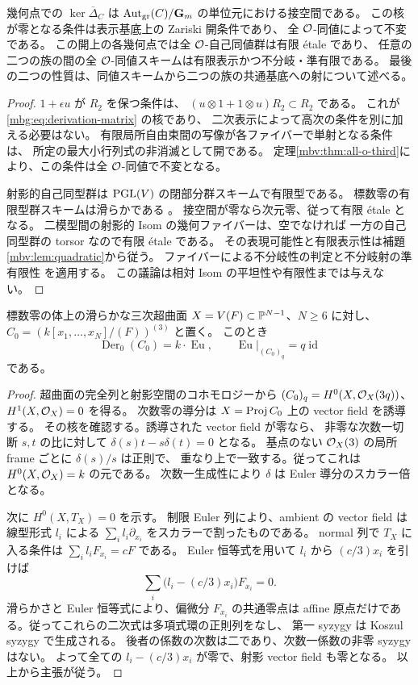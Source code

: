 \begin{lemma}[自己同値の接空間と開条件]
\label{mbg:lem:tangent-open}
幾何点での $\ker\overline\Delta_C$ は
$\operatorname{Aut}_{\mathrm{gr}}(C)/\mathbf G_m$ の単位元における接空間である。
この核が零となる条件は表示基底上の Zariski 開条件であり、
全 $\mathcal O$-同値によって不変である。
この開上の各幾何点では全 $\mathcal O$-自己同値群は有限 \'etale であり、
任意の二つの族の間の全 $\mathcal O$-同値スキームは有限表示かつ不分岐・準有限である。
最後の二つの性質は、同値スキームから二つの族の共通基底への射について述べる。
\end{lemma}
\begin{proof}
$1+\epsilon u$ が $R_2$ を保つ条件は、
$(u\otimes1+1\otimes u)R_2\subset R_2$ である。
これが \eqref{mbg:eq:derivation-matrix} の核であり、
二次表示によって高次の条件を別に加える必要はない。
有限局所自由束間の写像が各ファイバーで単射となる条件は、
所定の最大小行列式の非消滅として開である。
定理\ref{mbv:thm:all-o-third}により、この条件は全 $\mathcal O$-同値で不変となる。

射影的自己同型群は $\operatorname{PGL}(V)$ の閉部分群スキームで有限型である。
標数零の有限型群スキームは滑らかである
\cite[Tag~047N]{MBGStacks}。
接空間が零なら次元零、従って有限 \'etale となる。
二模型間の射影的 Isom の幾何ファイバーは、空でなければ
一方の自己同型群の torsor なので有限 \'etale である。
その表現可能性と有限表示性は補題\ref{mbv:lem:quadratic}から従う。
ファイバーによる不分岐性の判定と不分岐射の準有限性
\cite[Tag~02G3, Lemmas~29.36.10 and~29.36.12]{MBGStacks}を適用する。
この議論は相対 Isom の平坦性や有限性までは与えない。
\end{proof}

\begin{lemma}[滑らかな可換三次の切断環の導分]
\label{mbg:lem:commutative-tangent}
標数零の体上の滑らかな三次超曲面
$X=V(F)\subset\mathbb P^{N-1}$、$N\ge6$ に対し、
$C_0=(k[x_1,\ldots,x_N]/(F))^{(3)}$ と置く。
このとき
\[
 \operatorname{Der}_0(C_0)=k\cdot\operatorname{Eu},
 \qquad \operatorname{Eu}|_{(C_0)_q}=q\operatorname{id}
\]
である。
\end{lemma}
\begin{proof}
超曲面の完全列と射影空間のコホモロジーから
$(C_0)_q=H^0(X,\mathcal O_X(3q))$、$H^1(X,\mathcal O_X)=0$ を得る。
次数零の導分は $X=\operatorname{Proj} C_0$ 上の vector field を誘導する。
その核を確認する。誘導された vector field が零なら、
非零な次数一切断 $s,t$ の比に対して
$\delta(s)t-s\delta(t)=0$ となる。
基点のない $\mathcal O_X(3)$ の局所 frame ごとに $\delta(s)/s$ は正則で、
重なり上で一致する。従ってこれは $H^0(X,\mathcal O_X)=k$ の元である。
次数一生成性により $\delta$ は Euler 導分のスカラー倍となる。

次に $H^0(X,T_X)=0$ を示す。
制限 Euler 列により、ambient の vector field は
線型形式 $l_i$ による $\sum_i l_i\partial_{x_i}$ をスカラーで割ったものである。
normal 列で $T_X$ に入る条件は
$\sum_i l_iF_{x_i}=cF$ である。
Euler 恒等式を用いて $l_i$ から $(c/3)x_i$ を引けば
\[
 \sum_i\bigl(l_i-(c/3)x_i\bigr)F_{x_i}=0.
\]
滑らかさと Euler 恒等式により、偏微分 $F_{x_i}$ の共通零点は
affine 原点だけである。従ってこれらの二次式は多項式環の正則列をなし、
第一 syzygy は Koszul syzygy で生成される。
後者の係数の次数は二であり、次数一係数の非零 syzygy はない。
よって全ての $l_i-(c/3)x_i$ が零で、射影 vector field も零となる。
以上から主張が従う。
\end{proof}

